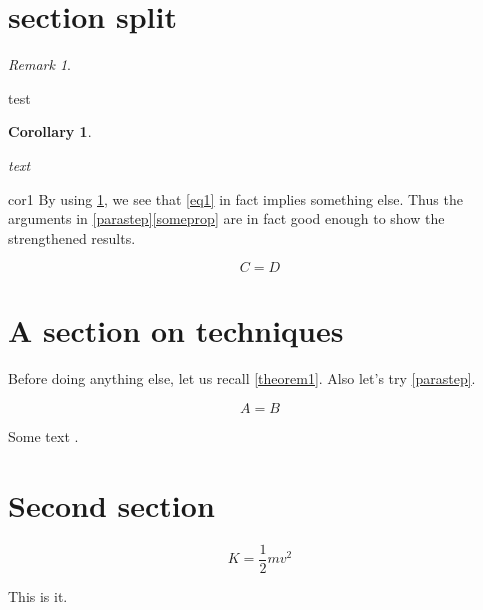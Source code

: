 \documentclass[amssymb,amsfonts]{amsart}
\theoremstyle{plain} %
\newtheorem{corollary}[theorem]{Corollary}
\theoremstyle{definition} %
\theoremstyle{remark} %
\newtheorem{remark}[theorem]{Remark}
\begin{document}
\section{section split}


\begin{remark}\label{rmk1}
	\lipsum[27]

	test
\end{remark}

\begin{corollary}\label{cor1}
	\lipsum[24]

	text
\end{corollary}

\begin{pfof}{cor1}
	By using \cref{rmk1}, we see that \cref{eq1} in fact implies something else. Thus the arguments in \cref{parastep}\cref{someprop} are in fact good enough to show the strengthened results. 
\end{pfof}

\begin{equation}
	C = D
\end{equation}

\section{A section on techniques}

Before doing anything else, let us recall \cref{theorem1}. Also let's try \cref{parastep}.

\lipsum[2]

\begin{equation}
	A = B
\end{equation}

\lipsum[3-8]




\lipsum[5-9]

Some text \cite{Wong2009}.


\section{Second section}


\lipsum[10-23]

\begin{equation}
K = \frac12 mv^2
\end{equation}

This is it.


%
%
\end{document}
